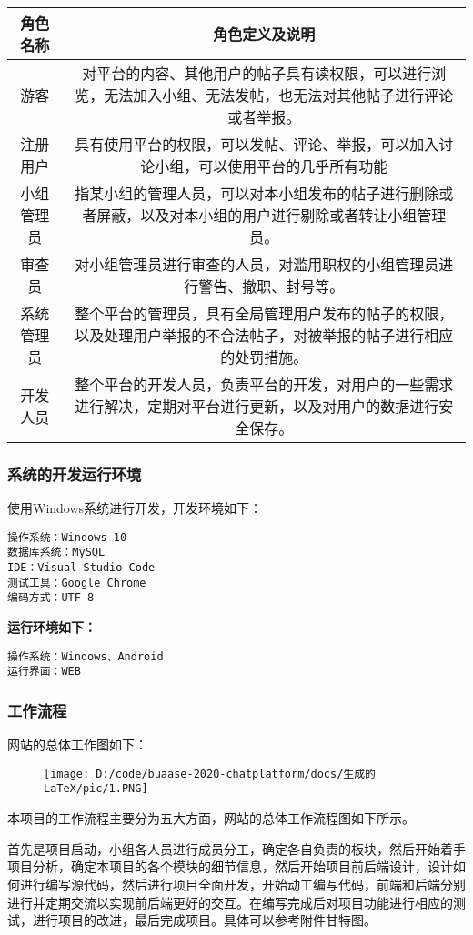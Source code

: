 \documentclass[
]{article}
\begin{document}
\begin{longtable}[]{@{}cc@{}}
\toprule
角色名称 & 角色定义及说明\tabularnewline
\midrule
\endhead
游客 &
对平台的内容、其他用户的帖子具有读权限，可以进行浏览，无法加入小组、无法发帖，也无法对其他帖子进行评论或者举报。\tabularnewline
注册用户 &
具有使用平台的权限，可以发帖、评论、举报，可以加入讨论小组，可以使用平台的几乎所有功能\tabularnewline
小组管理员 &
指某小组的管理人员，可以对本小组发布的帖子进行删除或者屏蔽，以及对本小组的用户进行剔除或者转让小组管理员。\tabularnewline
审查员 &
对小组管理员进行审查的人员，对滥用职权的小组管理员进行警告、撤职、封号等。\tabularnewline
系统管理员 &
整个平台的管理员，具有全局管理用户发布的帖子的权限，以及处理用户举报的不合法帖子，对被举报的帖子进行相应的处罚措施。\tabularnewline
开发人员 &
整个平台的开发人员，负责平台的开发，对用户的一些需求进行解决，定期对平台进行更新，以及对用户的数据进行安全保存。\tabularnewline
\bottomrule
\end{longtable}

\hypertarget{header-n94}{%
\subsubsection{系统的开发运行环境}\label{header-n94}}

使用Windows系统进行开发，开发环境如下：

\begin{verbatim}
操作系统：Windows 10
数据库系统：MySQL
IDE：Visual Studio Code
测试工具：Google Chrome
编码方式：UTF-8
\end{verbatim}

\textbf{运行环境如下：}

\begin{verbatim}
操作系统：Windows、Android
运行界面：WEB
\end{verbatim}

\hypertarget{header-n99}{%
\subsubsection{工作流程}\label{header-n99}}

网站的总体工作图如下：

\begin{figure}
\centering
\texttt{[image: D:/code/buaase-2020-chatplatform/docs/生成的LaTeX/pic/1.PNG]}
\caption{}
\end{figure}

本项目的工作流程主要分为五大方面，网站的总体工作流程图如下所示。

首先是项目启动，小组各人员进行成员分工，确定各自负责的板块，然后开始着手项目分析，确定本项目的各个模块的细节信息，然后开始项目前后端设计，设计如何进行编写源代码，然后进行项目全面开发，开始动工编写代码，前端和后端分别进行并定期交流以实现前后端更好的交互。在编写完成后对项目功能进行相应的测试，进行项目的改进，最后完成项目。具体可以参考附件甘特图。
\end{document}
